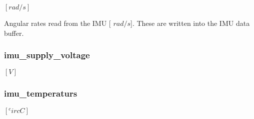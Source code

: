 $[rad/s]$ 

\-Angular rates read from the \-I\-M\-U \mbox{[} $rad/s$\mbox{]}. \-These are written into the \-I\-M\-U data buffer. \hypertarget{group__imu__interface_ga3f561003deb253bcc716a6c690c87cfe}{
\subsubsection[{imu\-\_\-supply\-\_\-voltage}]{ {\bf imu\-\_\-supply\-\_\-voltage}}}
\label{group__imu__interface_ga3f561003deb253bcc716a6c690c87cfe}


$[V]$ 

\hypertarget{group__imu__interface_gacd438fa96131e9024d8ad206d83ffb66}{
\subsubsection[{imu\-\_\-temperaturs}]{ {\bf imu\-\_\-temperaturs}}}
\label{group__imu__interface_gacd438fa96131e9024d8ad206d83ffb66}


$[^circ C]$ 

